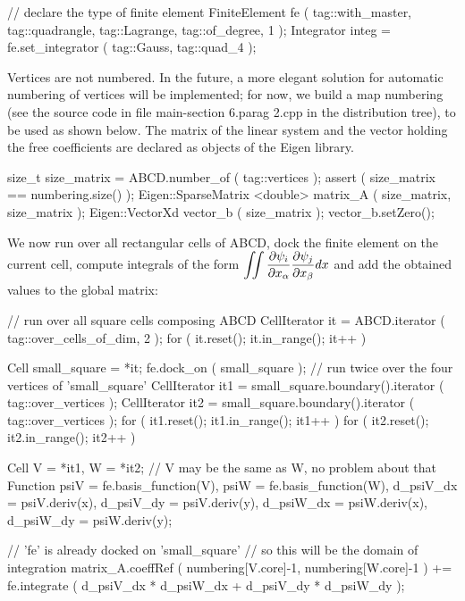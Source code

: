    // declare the type of finite element
   FiniteElement fe
      ( tag::with_master, tag::quadrangle, tag::Lagrange, tag::of_degree, 1 );
   Integrator integ = fe.set_integrator ( tag::Gauss, tag::quad_4 );
\endverbatim

Vertices are not numbered. In the future, a more elegant solution for automatic numbering
of vertices will be implemented; for now, we build a map {\codett numbering} (see the source
code in file {\codett main-\numb section 6.\numb parag 2.cpp} in the distribution tree),
to be used as shown below.
The matrix of the linear system and the vector holding the free coefficients
are declared as objects of the {\codett Eigen} library.

\verbatim
   size_t size_matrix = ABCD.number_of ( tag::vertices );
   assert ( size_matrix == numbering.size() );
   Eigen::SparseMatrix <double> matrix_A ( size_matrix, size_matrix );
   Eigen::VectorXd vector_b ( size_matrix );  vector_b.setZero();
\endverbatim

We now run over all rectangular cells of {\codett ABCD}, dock the finite element
on the current cell,
compute integrals of the form $ \displaystyle \int\!\!\!\int {\partial \psi_i \over
\partial x_\alpha} {\partial \psi_j \over \partial x_\beta} dx $ and add the obtained
values to the global matrix:

\verbatim
   // run over all square cells composing ABCD
   CellIterator it = ABCD.iterator ( tag::over_cells_of_dim, 2 );
   for ( it.reset(); it.in_range(); it++ )
   {  Cell small_square = *it;
      fe.dock_on ( small_square );
      // run twice over the four vertices of 'small_square'
      CellIterator it1 = small_square.boundary().iterator ( tag::over_vertices );
      CellIterator it2 = small_square.boundary().iterator ( tag::over_vertices );
      for ( it1.reset(); it1.in_range(); it1++ )
      for ( it2.reset(); it2.in_range(); it2++ )
      {  Cell V = *it1, W = *it2;
         // V may be the same as W, no problem about that
         Function psiV = fe.basis_function(V),
                  psiW = fe.basis_function(W),
                  d_psiV_dx = psiV.deriv(x),
                  d_psiV_dy = psiV.deriv(y),
                  d_psiW_dx = psiW.deriv(x),
                  d_psiW_dy = psiW.deriv(y);
\endverbatim

\verbatim
         // 'fe' is already docked on 'small_square'
         // so this will be the domain of integration
         matrix_A.coeffRef ( numbering[V.core]-1, numbering[W.core]-1 ) +=
            fe.integrate ( d_psiV_dx * d_psiW_dx + d_psiV_dy * d_psiW_dy );      }  }
\endverbatim

